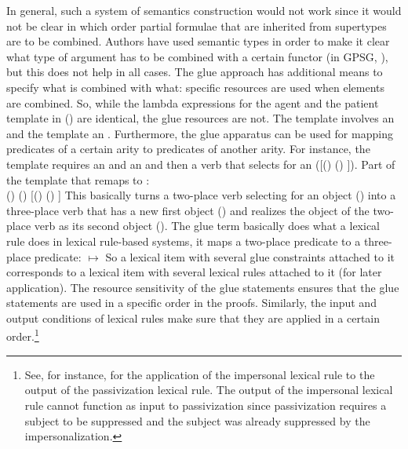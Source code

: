 In general, such a system of semantics construction would not work since it would not be clear in
which order partial formulae that are inherited from supertypes are to
be combined. Authors have used
semantic types in order to make it clear what type of argument has to be combined with a certain
functor (\eg in GPSG, \citealt[Chapters~9--10]{GKPS85a}), but this does not help in all cases. The glue approach has
additional means to specify what is combined with what: specific resources are used when elements are
combined. So, while the lambda expressions for the agent and the patient template in () are
identical, the glue resources are not. The  template involves an \argone and the 
template an \argtwo. Furthermore, the glue apparatus can be used for mapping predicates of a certain
arity to predicates of another arity. For instance, the  template requires an  and an 
and then a verb that selects for an  ([(\upsig {}) \linimp (\upsig {}) \linimp \Upsig]). 
\ea
Part of the  template that remaps \argtwo to \argthree:\\
(\upsig {}) \linimp (\upsig {}) \linimp {}[(\upsig {}) \linimp (\upsig {}) \linimp \Upsig]
\z
This basically turns a two-place verb selecting for an object (\argtwo) into a three-place verb that
has a new first object (\argtwo) and realizes the object of the two-place verb as its second object
(\argthree). The glue term basically does what a lexical rule does in
lexical rule-based systems, it maps a two-place predicate to a three-place predicate:
\ea
{} $\mapsto$ 
\z
So a lexical item with several glue constraints attached to it corresponds to a lexical item with
several lexical rules attached to it (for later application). The resource sensitivity of the glue statements ensures that
the glue statements are used in a specific order in the proofs. Similarly, the input and output
conditions of lexical rules make sure that they are applied in a certain order.\footnote{%
See, for instance,  for the application of the impersonal lexical rule to the output of the
passivization lexical rule. The output of the impersonal lexical rule cannot function as input to
passivization since passivization requires a subject to be suppressed and the subject was already
suppressed by the impersonalization.}

